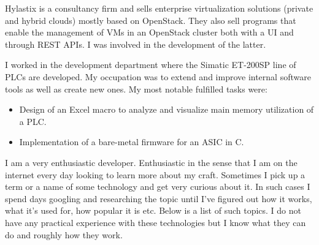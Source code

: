 


\medskip
Hylastix is a consultancy firm and sells enterprise virtualization solutions (private and hybrid clouds) mostly based on OpenStack. They also sell programs that enable the management of VMs in an OpenStack cluster both with a UI and through REST APIs. I was involved in the development of the latter.

\divider

    

\medskip
I worked in the development department where the Simatic ET-200SP line of PLCs are developed. My occupation was to extend and improve internal software tools as well as create new ones. My most notable fulfilled tasks were: 

\smallskip
\begin{itemize}
\item Design of an Excel macro to analyze and visualize main memory utilization of a PLC.
\item Implementation of a bare-metal firmware for an ASIC in C.
\end{itemize}


\smallskip
{}

I am a very enthusiastic developer. Enthusiastic in the sense that I am on the internet every day looking to learn more about my craft. Sometimes I pick up a term or a name of some technology and get very curious about it. In such cases I spend days googling and researching the topic until I've figured out how it works, what it's used for, how popular it is etc. Below is a list of such topics. I do not have any practical experience with these technologies but I know what they can do and roughly how they work.

\begin{flushleft}

\end{flushleft}

